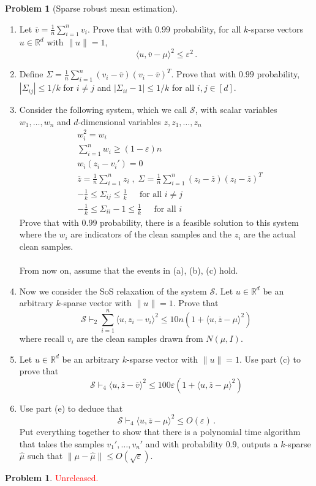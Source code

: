 \documentclass[11pt]{article}
\theoremstyle{definition}
\newtheorem{problem}[theorem]{Problem}
\newcommand{\R}{\mathbb{R}} %
\renewcommand{\epsilon}{\varepsilon}
\begin{document}
\begin{problem}[Sparse robust mean estimation]
  \begin{enumerate}[label=(\alph*)]
    \item Let $\overline{v} = \frac{1}{n} \sum_{i = 1}^n v_i$.  Prove that with $0.99$ probability, for all $k$-sparse vectors $u \in \R^d$ with $\| u \| = 1$,
    \[
    \langle u, \overline{v} - \mu \rangle^2 \leq \epsilon^2 \,.  
    \]
    \item Define $\Sigma = \frac{1}{n} \sum_{i = 1}^n (v_i - \overline{v}) (v_i - \overline{v})^T$. 
     Prove that with $0.99$ probability, $|\Sigma_{ij}| \leq 1/k$ for $i \neq j$ and $| \Sigma_{ii} - 1| \leq 1/k$ for all $i,j \in [d]$.
    \item Consider the following system, which we call $\mathcal{S}$, with scalar variables $w_1, \dots , w_n$ and $d$-dimensional variables $z, z_1, \dots ,  z_n$
    \[
    \begin{split}
    &w_i^2 = w_i \\
    & \sum_{i = 1}^n w_i \geq (1 - \epsilon) n \\
    &w_i(z_i - v_i') = 0 \\
    &\overline{z} =  \frac{1}{n} \sum_{i = 1}^n z_i \; , \; \Sigma = \frac{1}{n} \sum_{i = 1}^n (z_i - \overline{z}) (z_i - \overline{z})^T \\ 
    &-\frac{1}{k} \leq \Sigma_{ij} \leq \frac{1}{k}  \;\;\;\; \text{ for all } i \neq j  \\
    &-\frac{1}{k} \leq \Sigma_{ii} - 1 \leq \frac{1}{k} \;\;\;\; \text{ for all } i
    \end{split}
    \]
    Prove that with $0.99$ probability, there is a feasible solution to this system where the $w_i$ are indicators of the clean samples and the $z_i$ are the actual clean samples.
    \\\\
    From now on, assume that the events in (a), (b), (c) hold.
    \item Now we consider the SoS relaxation of the system $\mathcal{S}$.  Let $u \in \R^d$ be an arbitrary $k$-sparse vector with $\| u \| = 1$.  Prove that 
    \[
    \mathcal{S} \vdash_2 \sum_{i = 1}^n \langle u, z_i - v_i \rangle^2  \leq 10 n (1 + \langle u, \overline{z} - \mu \rangle^2  )
    \]
    where recall $v_i$ are the clean samples drawn from $N(\mu, I)$.    
    \item Let $u \in \R^d$ be an arbitrary $k$-sparse vector with $\| u \| = 1$.  Use part (c) to prove that 
    \[
    \mathcal{S} \vdash_4 \langle u, \overline{z} - \overline{v} \rangle^2 \leq   100 \epsilon  (1 + \langle u, \overline{z} - \mu \rangle^2  )
    \]
    \item Use part (e) to deduce that 
    \[
    \mathcal{S} \vdash_4 \langle u, \overline{z} - \mu \rangle^2 \leq O(\epsilon) \,.
    \]
    Put everything together to show that there is a polynomial time algorithm that takes the samples $v_1', \dots , v_n'$ and with probability $0.9$, outputs a $k$-sparse $\widehat{\mu}$ such that $\| \mu - \widehat{\mu} \| \leq O(\sqrt{\epsilon})$.
  \end{enumerate}

\end{problem}

\begin{problem}
  \textcolor{red}{Unreleased.}
\end{problem}
\end{document}
